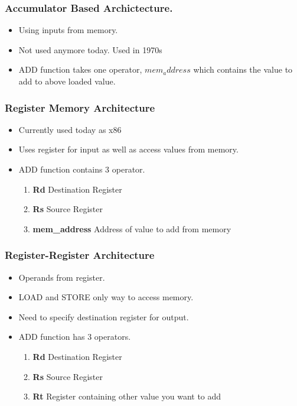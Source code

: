 \documentclass{article}
\begin{document}
		\subsubsection*{Accumulator Based Archictecture.}
			\begin{itemize}
				\item Using inputs from memory.
				\item Not used anymore today. Used in 1970s
				\item ADD function takes one operator, $mem_address$ which contains the value to add to above loaded value.
			\end{itemize}

		\subsubsection*{Register Memory Architecture}
			\begin{itemize}
				\item Currently used today as x86
				\item Uses register for input as well as access values from memory.
				\item ADD function contains 3 operator.
					\begin{enumerate}
						\item \textbf{Rd} Destination Register
						\item \textbf{Rs} Source Register
						\item \textbf{mem\_address} Address of value to add from memory
					\end{enumerate}
			\end{itemize}

		\subsubsection*{Register-Register Architecture}
			\begin{itemize}
				\item Operands from register.
				\item LOAD and STORE only way to access memory.
				\item Need to specify destination register for output.
				\item ADD function has 3 operators.
					\begin{enumerate}
						\item \textbf{Rd} Destination Register
						\item \textbf{Rs} Source Register 
						\item \textbf{Rt} Register containing other value you want to add
					\end{enumerate}
			\end{itemize}
\end{document}
